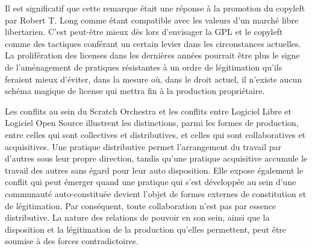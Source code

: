 {Il est significatif que cette remarque \'etait une r\'eponse \`a la
promotion du copyleft par Robert T. Long comme \'etant compatible avec
les valeurs d'un march\'e libre libertarien. C'est peut{}-\^etre mieux
d\`es lors d'envisager la GPL et le copyleft comme des tactiques
conf\'erant un certain levier dans les circonstances actuelles. La
prolif\'eration des licenses  dans les derni\`eres ann\'ees
pourrait \^etre plus le signe de l'am\'enagement de pratiques
r\'esistantes \`a un ordre de l\'egitimation qu'ils feraient mieux
d'\'eviter, dans la mesure o\`u, dans le droit actuel, il n'existe
aucun sch\'ema magique de license qui mettra fin \`a la production
propri\'etaire.


Les conflits au sein du Scratch Orchestra et les conflits entre Logiciel
Libre et Logiciel Open Source illustrent les distinctions, parmi les
formes de production, entre celles qui sont collectives et
distributives, et celles qui sont collaboratives et acquisitives. Une
pratique distributive permet l'arrangement du travail par d'autres sous
leur propre direction, tandis qu'une pratique acquisitive accumule le
travail des autres sans \'egard pour leur auto disposition. Elle expose
\'egalement le conflit qui peut \'emerger quand une pratique qui s'est
d\'evelopp\'ee au sein d'une communaut\'e auto{}-constitu\'ee devient
l'objet de formes externes de constitution et de l\'egitimation. Par
cons\'equent, toute collaboration n'est pas par essence distributive.
La nature des relations de pouvoir en son sein, ainsi que la
disposition et la l\'egitimation de la production qu'elles permettent,
peut \^etre soumise \`a des forces contradictoires.

}

